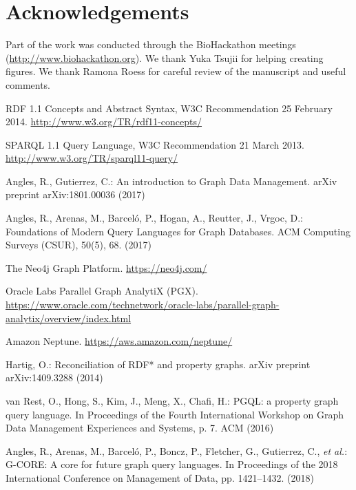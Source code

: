 \documentclass[runningheads]{llncs}
\begin{document}
\section*{Acknowledgements}
Part of the work was conducted through the BioHackathon meetings (\url{http://www.biohackathon.org}). We thank Yuka Tsujii for helping creating figures. We thank Ramona Roess for careful review of the manuscript and useful comments.

%
%
%

% 
%
\begin{thebibliography}{8}

RDF 1.1 Concepts and Abstract Syntax, W3C Recommendation 25 February 2014. \url{http://www.w3.org/TR/rdf11-concepts/}

SPARQL 1.1 Query Language, W3C Recommendation 21 March 2013. \url{http://www.w3.org/TR/sparql11-query/}

Angles, R., Gutierrez, C.: An introduction to Graph Data Management. arXiv preprint arXiv:1801.00036 (2017)

Angles, R., Arenas, M., Barceló, P., Hogan, A., Reutter, J., Vrgoc, D.: Foundations of Modern Query Languages for Graph Databases. ACM Computing Surveys (CSUR), 50(5), 68. (2017)

The Neo4j Graph Platform. \url{https://neo4j.com/}

Oracle Labs Parallel Graph AnalytiX (PGX). \url{https://www.oracle.com/technetwork/oracle-labs/parallel-graph-analytix/overview/index.html}

Amazon Neptune. \url{https://aws.amazon.com/neptune/}
 
Hartig, O.: Reconciliation of RDF* and property graphs. arXiv preprint arXiv:1409.3288 (2014)

van Rest, O., Hong, S., Kim, J., Meng, X., Chafi, H.: PGQL: a property graph query language. In Proceedings of the Fourth International Workshop on Graph Data Management Experiences and Systems, p. 7. ACM (2016)

Angles, R., Arenas, M., Barceló, P., Boncz, P., Fletcher, G., Gutierrez, C., {\itshape et al.}: G-CORE: A core for future graph query languages. In Proceedings of the 2018 International Conference on Management of Data, pp. 1421--1432. (2018)


\end{thebibliography}
\end{document}
